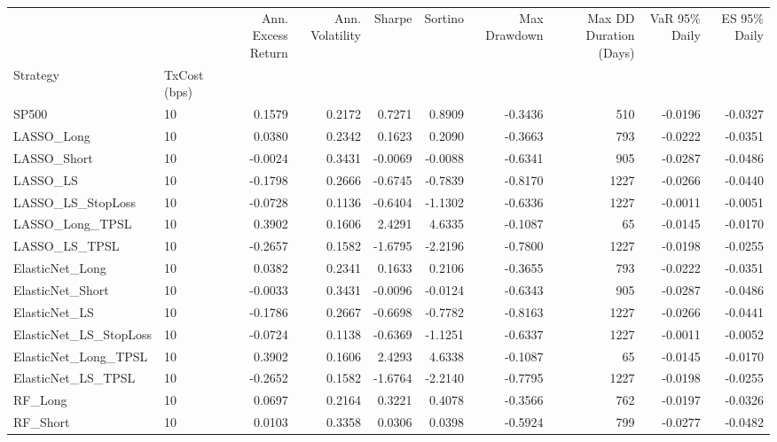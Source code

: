 \begin{tabular}{llrrrrrrrr}
\toprule
 &  & Ann. Excess Return & Ann. Volatility & Sharpe & Sortino & Max Drawdown & Max DD Duration (Days) & VaR 95\% Daily & ES 95\% Daily \\
Strategy & TxCost (bps) &  &  &  &  &  &  &  &  \\
\midrule
SP500 & 10 & 0.1579 & 0.2172 & 0.7271 & 0.8909 & -0.3436 & 510 & -0.0196 & -0.0327 \\
\cline{1-10}
LASSO\_Long & 10 & 0.0380 & 0.2342 & 0.1623 & 0.2090 & -0.3663 & 793 & -0.0222 & -0.0351 \\
\cline{1-10}
LASSO\_Short & 10 & -0.0024 & 0.3431 & -0.0069 & -0.0088 & -0.6341 & 905 & -0.0287 & -0.0486 \\
\cline{1-10}
LASSO\_LS & 10 & -0.1798 & 0.2666 & -0.6745 & -0.7839 & -0.8170 & 1227 & -0.0266 & -0.0440 \\
\cline{1-10}
LASSO\_LS\_StopLoss & 10 & -0.0728 & 0.1136 & -0.6404 & -1.1302 & -0.6336 & 1227 & -0.0011 & -0.0051 \\
\cline{1-10}
LASSO\_Long\_TPSL & 10 & 0.3902 & 0.1606 & 2.4291 & 4.6335 & -0.1087 & 65 & -0.0145 & -0.0170 \\
\cline{1-10}
LASSO\_LS\_TPSL & 10 & -0.2657 & 0.1582 & -1.6795 & -2.2196 & -0.7800 & 1227 & -0.0198 & -0.0255 \\
\cline{1-10}
ElasticNet\_Long & 10 & 0.0382 & 0.2341 & 0.1633 & 0.2106 & -0.3655 & 793 & -0.0222 & -0.0351 \\
\cline{1-10}
ElasticNet\_Short & 10 & -0.0033 & 0.3431 & -0.0096 & -0.0124 & -0.6343 & 905 & -0.0287 & -0.0486 \\
\cline{1-10}
ElasticNet\_LS & 10 & -0.1786 & 0.2667 & -0.6698 & -0.7782 & -0.8163 & 1227 & -0.0266 & -0.0441 \\
\cline{1-10}
ElasticNet\_LS\_StopLoss & 10 & -0.0724 & 0.1138 & -0.6369 & -1.1251 & -0.6337 & 1227 & -0.0011 & -0.0052 \\
\cline{1-10}
ElasticNet\_Long\_TPSL & 10 & 0.3902 & 0.1606 & 2.4293 & 4.6338 & -0.1087 & 65 & -0.0145 & -0.0170 \\
\cline{1-10}
ElasticNet\_LS\_TPSL & 10 & -0.2652 & 0.1582 & -1.6764 & -2.2140 & -0.7795 & 1227 & -0.0198 & -0.0255 \\
\cline{1-10}
RF\_Long & 10 & 0.0697 & 0.2164 & 0.3221 & 0.4078 & -0.3566 & 762 & -0.0197 & -0.0326 \\
\cline{1-10}
RF\_Short & 10 & 0.0103 & 0.3358 & 0.0306 & 0.0398 & -0.5924 & 799 & -0.0277 & -0.0482 \\
\cline{1-10}

\end{tabular}
